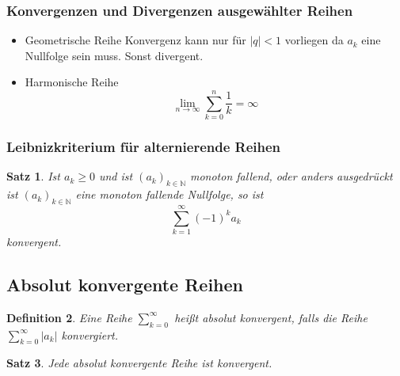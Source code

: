 \documentclass[12pt,a4paper]{article}%
\newtheorem{satz}{Satz}[section]
\newtheorem{definition}[satz]{Definition}
\numberwithin{equation}{section}
\newcommand{\N}{\mathbb{N}}
\numberwithin{equation}{subsection}
\begin{document}
	  \subsubsection{Konvergenzen und Divergenzen ausgewählter Reihen}
	  \begin{itemize}
	    \item Geometrische Reihe \newline
	    Konvergenz kann nur für $|q| < 1$ vorliegen da $a_k$ eine Nullfolge sein muss. Sonst divergent.
	    \item Harmonische Reihe \newline
	    \begin{equation}
	      \lim\limits_{n \rightarrow \infty} \sum\limits_{k = 0}^n \frac{1}{k} = \infty
	    \end{equation}
	  \end{itemize}
	  
	  \subsubsection{Leibnizkriterium für alternierende Reihen}
	  \begin{satz}
	    Ist $a_k \geq 0$ und ist $(a_k)_{k \in \N}$ monoton fallend, oder anders ausgedrückt ist $(a_k)_{k \in \N}$ eine monoton fallende Nullfolge, so ist
	    \begin{equation*}
	      \sum\limits_{k = 1}^{\infty} (-1)^k a_k
	    \end{equation*}
	    konvergent.
	  \end{satz}
  
  \subsection{Absolut konvergente Reihen}
  \begin{definition}
    Eine Reihe $\sum\limits_{k=0}^\infty$ heißt absolut konvergent, falls die Reihe $\sum\limits_{k=0}^\infty |a_k|$ konvergiert.
  \end{definition}
  \begin{satz}
    Jede absolut konvergente Reihe ist konvergent.
  \end{satz}
\end{document}
